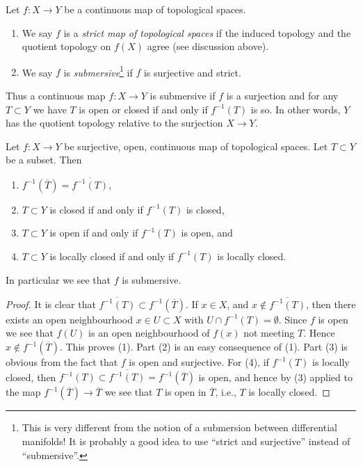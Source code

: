 \begin{definition}
\label{definition-submersive}
Let $f : X \to Y$ be a continuous map of topological spaces.
\begin{enumerate}
\item We say $f$ is a {\it strict map of topological spaces}
if the induced topology and the quotient topology on $f(X)$ agree
(see discussion above).
\item We say $f$ is {\it submersive}\footnote{This is very different from
the notion of a submersion between differential manifolds! It is probably
a good idea to use ``strict and surjective'' instead of ``submersive''.}
if $f$ is surjective and strict.
\end{enumerate}
\end{definition}

\noindent
Thus a continuous map $f : X \to Y$ is submersive if $f$
is a surjection and for any $T \subset Y$ we have
$T$ is open or closed if and only if $f^{-1}(T)$ is so.
In other words, $Y$ has the
quotient topology relative to the surjection $X \to Y$.

\begin{lemma}
\label{lemma-open-morphism-quotient-topology}
Let $f : X \to Y$ be surjective, open, continuous map of topological spaces.
Let $T \subset Y$ be a subset. Then
\begin{enumerate}
\item $f^{-1}(\overline{T}) = \overline{f^{-1}(T)}$,
\item $T \subset Y$ is closed if and only if $f^{-1}(T)$ is closed,
\item $T \subset Y$ is open if and only if $f^{-1}(T)$ is open, and
\item $T \subset Y$ is locally closed if and only if $f^{-1}(T)$
is locally closed.
\end{enumerate}
In particular we see that $f$ is submersive.
\end{lemma}

\begin{proof}
It is clear that $\overline{f^{-1}(T)} \subset f^{-1}(\overline{T})$.
If $x \in X$, and $x \not \in \overline{f^{-1}(T)}$, then there
exists an open neighbourhood $x \in U \subset X$ with
$U \cap f^{-1}(T) = \emptyset$. Since $f$ is open we see that
$f(U)$ is an open neighbourhood of $f(x)$ not meeting $T$.
Hence $x \not \in f^{-1}(\overline{T})$. This proves (1).
Part (2) is an easy consequence of (1).
Part (3) is obvious from the fact that $f$ is open and surjective.
For (4), if $f^{-1}(T)$ is locally closed, then
$f^{-1}(T) \subset \overline{f^{-1}(T)} = f^{-1}(\overline{T})$
is open, and hence by (3) applied to the map
$f^{-1}(\overline{T}) \to \overline{T}$ we see that
$T$ is open in $\overline{T}$, i.e., $T$ is locally closed.
\end{proof}

